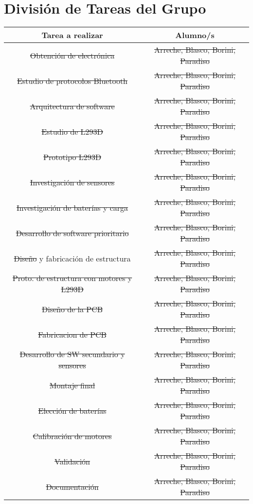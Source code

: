 \section{División de Tareas del Grupo}

\begin{tabular}{|c|c|}
	\hline 
	\textbf{Tarea a realizar} & \textbf{Alumno/s}  \\ 
	\hline 
	\sout{Obtención de electrónica} & \sout{Arreche, Blasco, Borini, Paradiso} \\ 
	\hline 
	\sout{Estudio de protocolos Bluetooth} & \sout{Arreche, Blasco, Borini, Paradiso} \\ 
	\hline 
	\sout{Arquitectura de software} & \sout{Arreche, Blasco, Borini, Paradiso} \\ 
	\hline 
	\sout{Estudio de L293D} & \sout{Arreche, Blasco, Borini, Paradiso} \\ 
	\hline 
	\sout{Prototipo L293D} & \sout{Arreche, Blasco, Borini, Paradiso} \\ 
	\hline 
	\sout{Investigación de sensores} & \sout{Arreche, Blasco, Borini, Paradiso} \\ 
	\hline 
	\sout{Investigación de baterías y carga} & \sout{Arreche, Blasco, Borini, Paradiso} \\ 
	\hline 
	\sout{Desarrollo de software prioritario} & \sout{Arreche, Blasco, Borini, Paradiso} \\ 
	\hline 
	\sout{Diseño} y fabricación de estructura & \sout{Arreche, Blasco, Borini, Paradiso} \\ 
	\hline 
	\sout{Proto. de estructura con motores y L293D} & \sout{Arreche, Blasco, Borini, Paradiso} \\ 
	\hline 
	\sout{Diseño de la PCB} & \sout{Arreche, Blasco, Borini, Paradiso} \\ 
	\hline 
	\sout{Fabricacion de PCB} & \sout{Arreche, Blasco, Borini, Paradiso} \\ 
	\hline 
	\sout{Desarrollo de SW secundario y sensores} & \sout{Arreche, Blasco, Borini, Paradiso} \\ 
	\hline 
	\sout{Montaje final} & \sout{Arreche, Blasco, Borini, Paradiso} \\ 
	\hline 
	\sout{Elección de baterías} & \sout{Arreche, Blasco, Borini, Paradiso} \\ 
	\hline 
	\sout{Calibración de motores} & \sout{Arreche, Blasco, Borini, Paradiso} \\ 
	\hline 
	\sout{Validación} & \sout{Arreche, Blasco, Borini, Paradiso} \\ 
	\hline 
	\sout{Documentación} & \sout{Arreche, Blasco, Borini, Paradiso} \\ 
	\hline 
\end{tabular} 